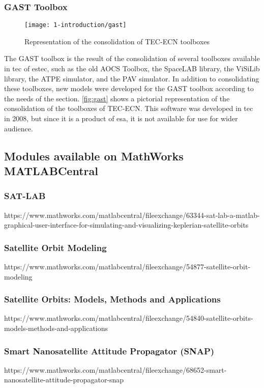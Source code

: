     \subsubsection{GAST Toolbox}
        \begin{figure}[hb]
            \centering
            \texttt{[image: 1-introduction/gast]}
            \caption{Representation of the consolidation of TEC-ECN toolboxes}
            \label{fig:gast}
        \end{figure}
        The GAST toolbox is the result of the consolidation of several toolboxes available in \ac{tec} of \ac{estec}, such as the old AOCS Toolbox, the SpaceLAB library, the ViSiLib library, the ATPE simulator, and the PAV simulator. In addition to consolidating these toolboxes, new models were developed for the GAST toolbox according to the needs of the section. \autoref{fig:gast} shows a pictorial representation of the consolidation of the toolboxes of TEC-ECN. This software was developed in \ac{tec} in 2008, but since it is a product of \ac{esa}, it is not available for use for wider audience.

    \subsection{Modules available on MathWorks MATLABCentral}
    \subsubsection{SAT-LAB}
    https://www.mathworks.com/matlabcentral/fileexchange/63344-sat-lab-a-matlab-graphical-user-interface-for-simulating-and-visualizing-keplerian-satellite-orbits
    \subsubsection{Satellite Orbit Modeling}
    https://www.mathworks.com/matlabcentral/fileexchange/54877-satellite-orbit-modeling
    \subsubsection{Satellite Orbits: Models, Methods and Applications}
    https://www.mathworks.com/matlabcentral/fileexchange/54840-satellite-orbits-models-methods-and-applications
    \subsubsection{Smart Nanosatellite Attitude Propagator (SNAP) }
    https://www.mathworks.com/matlabcentral/fileexchange/68652-smart-nanosatellite-attitude-propagator-snap
    


